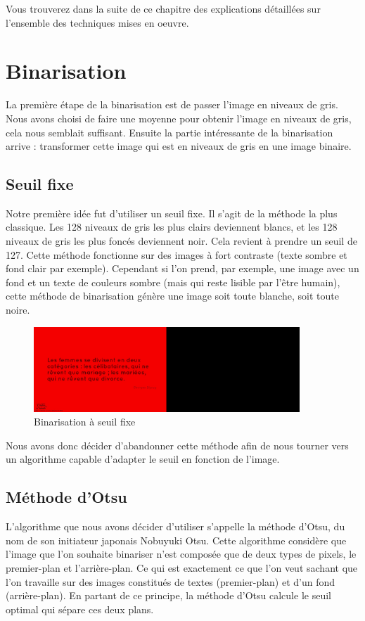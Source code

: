 \documentclass[11pt]{report}
\begin{document}
Vous trouverez dans la suite de ce chapitre des explications détaillées sur l'ensemble des techniques mises en oeuvre.

\section{Binarisation}

La première étape de la binarisation est de passer l’image en niveaux de gris. Nous avons choisi de faire une moyenne pour obtenir l’image en niveaux de gris, cela nous semblait suffisant. Ensuite la partie intéressante de la binarisation arrive : transformer cette image qui est en niveaux de gris en une image binaire.

\subsection{Seuil fixe}

Notre première idée fut d'utiliser un seuil fixe. Il s'agit de la méthode la plus classique. Les 128 niveaux de gris les plus clairs deviennent blancs, et les 128 niveaux de gris les plus foncés deviennent noir. Cela revient à prendre un seuil de 127. Cette méthode fonctionne sur des images à fort contraste (texte sombre et fond clair par exemple). Cependant si l'on prend, par exemple, une image avec un fond et un texte de couleurs sombre (mais qui reste lisible par l’être humain), cette méthode de binarisation génère une image soit toute blanche, soit toute noire.

\begin{figure}[htbp]
\centering
\includegraphics[width=10cm]{b_fixed.png}
\caption{Binarisation à seuil fixe}
\end{figure}

Nous avons donc décider d'abandonner cette méthode afin de nous tourner vers un algorithme capable d'adapter le seuil en fonction de l'image.

\subsection{Méthode d'Otsu}

L'algorithme que nous avons décider d'utiliser s'appelle la méthode d'Otsu, du nom de son initiateur japonais Nobuyuki Otsu. Cette algorithme considère que l’image que l’on souhaite binariser n’est composée que de deux types de pixels, le premier-plan et l’arrière-plan. Ce qui est exactement ce que l’on veut sachant que l’on travaille sur des images constitués de textes (premier-plan) et d’un fond (arrière-plan). En partant de ce principe, la méthode d'Otsu calcule le seuil optimal qui sépare ces deux plans.
\end{document}
